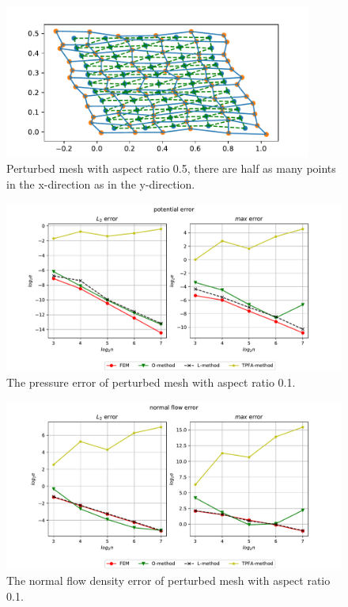 \documentclass[../Main/main.tex]{subfiles}
\begin{document}
		\begin{figure}[H]
			\centering
			\includegraphics[width=0.9\textwidth]{mesh_perturbed_1d2.pdf}
			\caption{Perturbed mesh with aspect ratio 0.5, there are half as many points in the x-direction as in the y-direction.}
			\label{fig:mesh_perturbed_1d2}
		\end{figure}
		\begin{figure}[h]
		\advance\leftskip-1cm
			\includegraphics[width=1.2\textwidth]{pressure_perturbed_1d10.pdf}
			\caption{The pressure error of perturbed mesh with aspect ratio 0.1.}
		\end{figure}
			\begin{figure}[h]
			\advance\leftskip-1cm
			\includegraphics[width=1.2\textwidth]{flow_perturbed_1d10.pdf}
			\caption{The normal flow density error of perturbed mesh with aspect ratio 0.1.}
		\end{figure}
\end{document}
